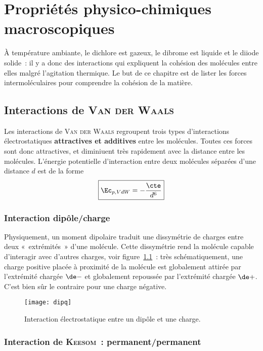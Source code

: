 \documentclass[../main/main.tex]{subfiles}
\begin{document}
\setcounter{chapter}{1}

\chapter{Propri\'et\'es physico-chimiques macroscopiques}

À température ambiante, le dichlore est gazeux, le dibrome est liquide et le
diiode solide~: il y a donc des interactions qui expliquent la cohésion des
molécules entre elles malgré l'agitation thermique. Le but de ce chapitre est de
lister les forces intermoléculaires pour comprendre la cohésion de la matière.

\section{Interactions de \textsc{Van der Waals}}

Les interactions de \textsc{Van der Waals} regroupent trois types d'interactions
électrostatiques \textbf{attractives et additives} entre les molécules. Toutes
ces forces sont donc attractives, et diminiuent très rapidement avec la distance
entre les molécules. L'énergie potentielle d'interaction entre deux molécules
séparées d'une distance $d$ est de la forme
\[\boxed{\Ec_{p,VdW} = -\frac{\cte}{d^6}}\]

\subsection{Interaction dipôle/charge}

Physiquement, un moment dipolaire traduit une dissymétrie de charges entre deux
«~extrémités~» d'une molécule. Cette dissymétrie rend la molécule capable
d'interagir avec d'autres charges, voir figure~\ref{fig:dipq}~: très
schématiquement, une charge positive placée à proximité de la molécule est
globalement attirée par l'extrémité chargée $\de-$ et globalement repoussée par
l'extrémité chargée $\de+$. C'est bien sûr le contraire pour une charge
négative.

\begin{figure}[H]
    \centering
    \texttt{[image: dipq]}
    \caption{Interaction électrostatique entre un dipôle et une charge.}
    \label{fig:dipq}
\end{figure}

\subsection{Interaction de \textsc{Keesom}~: permanent/permanent}
\end{document}
